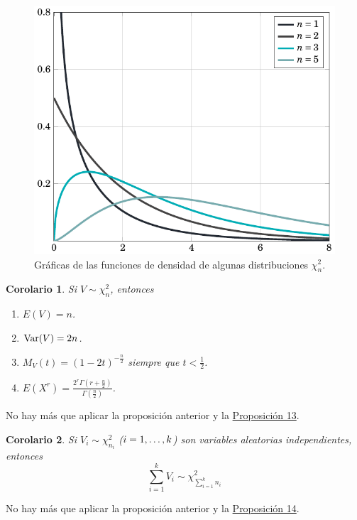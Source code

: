 \documentclass[11pt]{report}
\makeatletter
\renewenvironment{proof}[1][\proofname]{\par
  \pushQED{\qed}%
  \normalfont \topsep\z@skip %
  \trivlist
  \item[\hskip\labelsep
        \itshape
    #1\@addpunct{.}]\ignorespaces
}{%
  \popQED\endtrivlist\@endpefalse
}
\newtheorem{corollary}{Corolario} %
\theoremstyle{definition}
\makeatother
\begin{document}
\begin{figure}[H]
    \centering
    \includegraphics{ie_plot_chi.pdf}
    \caption{Gráficas de las funciones de densidad de algunas distribuciones $\chi^2_n$.}
\end{figure}

\begin{corollary}
\label{cor2.14}
Si $V \sim \chi^2_n$, entonces
\begin{enumerate}
    \item $E(V) = n$.
    \item $\textup{Var}(V) = 2n$.
    \item $\displaystyle M_V(t) = (1-2t)^{-\frac{n}{2}}$ siempre que $\displaystyle t < \frac{1}{2}$.
    \item $\displaystyle E(X^r) = \frac{2^r \Gamma(r+\frac{n}{2})}{\Gamma(\frac{n}{2})}$.
\end{enumerate}
\end{corollary}

\begin{proof}
No hay más que aplicar la proposición anterior y la \hyperref[prop2.9]{\color{blue}Proposición 13}.
\end{proof}

\begin{corollary}
Si $V_i \sim \chi^2_{n_i}$ ($i =1,\mathellipsis,k$) son variables aleatorias independientes, entonces
\[\sum_{i=1}^k V_i \sim \chi^2_{\sum_{i=1}^k n_i}\]
\end{corollary}

\begin{proof}
No hay más que aplicar la proposición anterior y la \hyperref[prop2.10]{\color{blue}Proposición 14}.
\end{proof}
\end{document}
